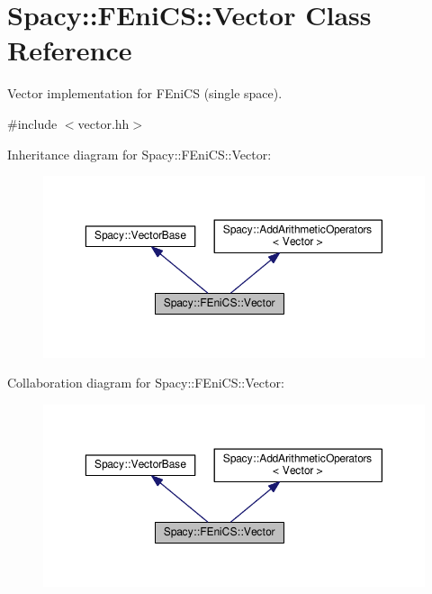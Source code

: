 \hypertarget{classSpacy_1_1FEniCS_1_1Vector}{\section{Spacy\-:\-:F\-Eni\-C\-S\-:\-:Vector Class Reference}
\label{classSpacy_1_1FEniCS_1_1Vector}
}


Vector implementation for F\-Eni\-C\-S (single space).  




{\ttfamily \#include $<$vector.\-hh$>$}



Inheritance diagram for Spacy\-:\-:F\-Eni\-C\-S\-:\-:Vector\-:
\nopagebreak
\begin{figure}[H]
\begin{center}
\leavevmode
\includegraphics[width=350pt]{classSpacy_1_1FEniCS_1_1Vector__inherit__graph}
\end{center}
\end{figure}


Collaboration diagram for Spacy\-:\-:F\-Eni\-C\-S\-:\-:Vector\-:
\nopagebreak
\begin{figure}[H]
\begin{center}
\leavevmode
\includegraphics[width=350pt]{classSpacy_1_1FEniCS_1_1Vector__coll__graph}
\end{center}
\end{figure}
